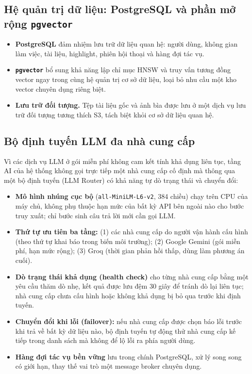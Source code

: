 \subsection{Hệ quản trị dữ liệu: PostgreSQL và phần mở rộng \texttt{pgvector}}
\begin{itemize}
    \item \textbf{PostgreSQL} đảm nhiệm lưu trữ dữ liệu quan hệ: người dùng, không gian làm việc, tài liệu, highlight, phiên hội thoại và hàng đợi tác vụ.
    \item \textbf{\texttt{pgvector}} bổ sung khả năng lập chỉ mục HNSW và truy vấn tương đồng vector ngay trong cùng hệ quản trị cơ sở dữ liệu, loại bỏ nhu cầu một kho vector chuyên dụng riêng biệt.
    \item \textbf{Lưu trữ đối tượng.} Tệp tài liệu gốc và ảnh bìa được lưu ở một dịch vụ lưu trữ đối tượng tương thích S3, tách biệt khỏi cơ sở dữ liệu quan hệ.
\end{itemize}

\subsection{Bộ định tuyến LLM đa nhà cung cấp}
Vì các dịch vụ LLM ở gói miễn phí không cam kết tính khả dụng liên tục, tầng AI của hệ thống không gọi trực tiếp một nhà cung cấp cố định mà thông qua một bộ định tuyến (LLM Router) có khả năng tự dò trạng thái và chuyển đổi:

\begin{itemize}
    \item \textbf{Mô hình nhúng cục bộ} (\texttt{all-MiniLM-L6-v2}, 384 chiều) chạy trên CPU của máy chủ, không phụ thuộc hạn mức của bất kỳ API bên ngoài nào cho bước truy xuất; chỉ bước sinh câu trả lời mới cần gọi LLM.
    \item \textbf{Thứ tự ưu tiên ba tầng:} (1) các nhà cung cấp do người vận hành cấu hình (theo thứ tự khai báo trong biến môi trường); (2) Google Gemini (gói miễn phí, hạn mức rộng); (3) Groq (thời gian phản hồi thấp, dùng làm phương án cuối).
    \item \textbf{Dò trạng thái khả dụng (health check)} cho từng nhà cung cấp bằng một yêu cầu thăm dò nhẹ, kết quả được lưu đệm 30 giây để tránh dò lại liên tục; nhà cung cấp chưa cấu hình hoặc không khả dụng bị bỏ qua trước khi định tuyến.
    \item \textbf{Chuyển đổi khi lỗi (failover):} nếu nhà cung cấp được chọn báo lỗi trước khi trả về bất kỳ dữ liệu nào, bộ định tuyến tự động thử nhà cung cấp kế tiếp trong danh sách mà không để lộ lỗi ra phía người dùng.
    \item \textbf{Hàng đợi tác vụ bền vững} lưu trong chính PostgreSQL, xử lý song song có giới hạn, thay thế vai trò một message broker chuyên dụng.
\end{itemize}
